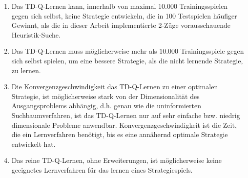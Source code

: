 \begin{enumerate}
\item Das TD-Q-Lernen kann, innerhalb von maximal 10.000 Trainingsspielen gegen sich selbst, keine Strategie entwickeln, die in 100 Testspielen häufiger Gewinnt, als die in dieser Arbeit implementierte 2-Züge vorausschauende Heuristik-Suche.
\item Das TD-Q-Lernen muss möglicherweise mehr als 10.000 Trainingsspiele gegen sich selbst spielen, um eine bessere Strategie, als die nicht lernende Strategie, zu lernen.
\item Die Konvergenzgeschwindigkeit das TD-Q-Lernen zu einer optimalen Strategie, ist möglicherweise stark von der Dimensionalität des Ausgangsproblems abhängig, d.h. genau wie die uninformierten Suchbaumverfahren, ist das TD-Q-Lernen nur auf sehr einfache bzw. niedrig dimensionale Probleme anwendbar. Konvergenzgeschwindigkeit ist die Zeit, die ein Lernverfahren benötigt, bis es eine annähernd optimale Strategie entwickelt hat.
\item Das reine TD-Q-Lernen, ohne Erweiterungen, ist möglicherweise keine geeignetes Lernverfahren für das lernen eines Strategiespiels.  
\end{enumerate}








